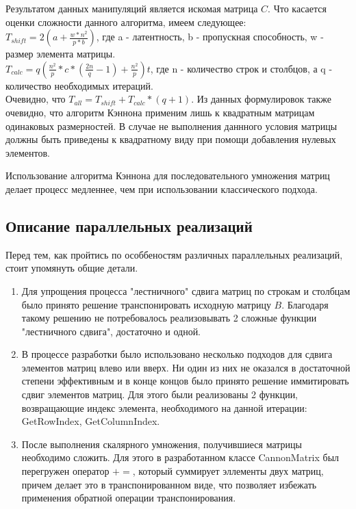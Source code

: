\documentclass[12pt]{article}
\begin{document}
Результатом данных манипуляций является искомая матрица $C$. Что касается оценки сложности данного алгоритма, имеем следующее: \\
$T_{shift} = 2( a + \frac{w * n^2}{p * b})$, где a - латентность, b - пропускная способность, w - размер элемента матрицы. \\

$T_{calc} = q(\frac{n^2}{p} * c * (\frac{2n}{q} - 1) + \frac{n^2}{p})t$, где n - количество строк и столбцов, а q - количество необходимых итераций. \\

Очевидно, что $T_{all} = T_{shift} + T_{calc} * (q + 1)$. Из данных формулировок также очевидно, что алгоритм Кэннона применим лишь к квадратным матрицам одинаковых размерностей. В случае не выполнения даннного условия матрицы должны быть приведены к квадратному виду при помощи добавления нулевых элементов.

Использование алгоритма Кэннона для последовательного умножения матриц делает процесс медленнее, чем при использовании классического подхода.
\newpage
\begin{center}
    \section{Описание параллельных реализаций}
\end{center}

Перед тем, как пройтись по особбеностям различных параллельных реализаций, стоит упомянуть общие детали.

\begin{enumerate}
    \item Для упрощения процесса "лестничного" сдвига матриц по строкам и столбцам было принято решение транспонировать исходную матрицу $B$. Благодаря такому решению не потребовалось реализовывать 2 сложные функции "лестничного сдвига", достаточно и одной.
    \item В процессе разработки было использовано несколько подходов для сдвига элементов матриц влево или вверх. Ни один из них не оказался в достаточной степени эффективным и в конце концов было принято решение иммитировать сдвиг элементов матриц. Для этого были реализованы 2 функции, возвращающие индекс элемента, необходимого на данной итерации: GetRowIndex, GetColumnIndex. 
    \item После выполнения скалярного умножения, получившиеся матрицы необходимо сложить. Для этого в разработанном классе CannonMatrix был перегружен оператор $+=$, который суммирует эллементы двух матриц, причем делает это в транспонированном виде, что позволяет избежать применения обратной операции транспонирования.
\end{enumerate} 
\end{document}
